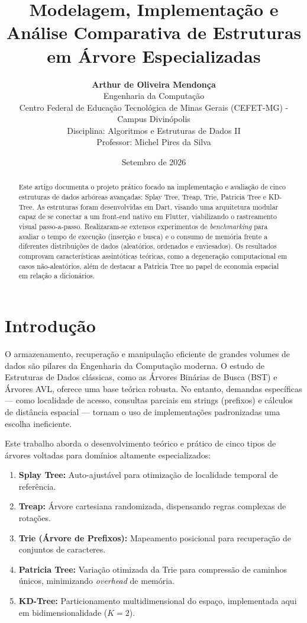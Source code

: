 \documentclass[12pt,a4paper]{article}
\title{\textbf{Modelagem, Implementação e Análise Comparativa de Estruturas em Árvore Especializadas}}
\author{
    \textbf{Arthur de Oliveira Mendonça} \\
    Engenharia da Computação \\
    Centro Federal de Educação Tecnológica de Minas Gerais (CEFET-MG) - Campus Divinópolis \\
    Disciplina: Algoritmos e Estruturas de Dados II \\
    Professor: Michel Pires da Silva
}
\date{Setembro de 2026}
\begin{document}
\maketitle

\begin{abstract}
Este artigo documenta o projeto prático focado na implementação e avaliação de cinco estruturas de dados arbóreas avançadas: Splay Tree, Treap, Trie, Patricia Tree e KD-Tree. As estruturas foram desenvolvidas em Dart, visando uma arquitetura modular capaz de se conectar a um front-end nativo em Flutter, viabilizando o rastreamento visual passo-a-passo. Realizaram-se extensos experimentos de \textit{benchmarking} para avaliar o tempo de execução (inserção e busca) e o consumo de memória frente a diferentes distribuições de dados (aleatórios, ordenados e enviesados). Os resultados comprovam características assintóticas teóricas, como a degeneração computacional em casos não-aleatórios, além de destacar a Patricia Tree no papel de economia espacial em relação a dicionários.
\end{abstract}

\newpage
\section{Introdução}
O armazenamento, recuperação e manipulação eficiente de grandes volumes de dados são pilares da Engenharia da Computação moderna. O estudo de Estruturas de Dados clássicas, como as Árvores Binárias de Busca (BST) e Árvores AVL, oferece uma base teórica robusta. No entanto, demandas específicas — como localidade de acesso, consultas parciais em strings (prefixos) e cálculos de distância espacial — tornam o uso de implementações padronizadas uma escolha ineficiente.

Este trabalho aborda o desenvolvimento teórico e prático de cinco tipos de árvores voltadas para domínios altamente especializados:
\begin{enumerate}
    \item \textbf{Splay Tree:} Auto-ajustável para otimização de localidade temporal de referência.
    \item \textbf{Treap:} Árvore cartesiana randomizada, dispensando regras complexas de rotações.
    \item \textbf{Trie (Árvore de Prefixos):} Mapeamento posicional para recuperação de conjuntos de caracteres.
    \item \textbf{Patricia Tree:} Variação otimizada da Trie para compressão de caminhos únicos, minimizando \textit{overhead} de memória.
    \item \textbf{KD-Tree:} Particionamento multidimensional do espaço, implementada aqui em bidimensionalidade ($K=2$).
\end{enumerate}
\end{document}
